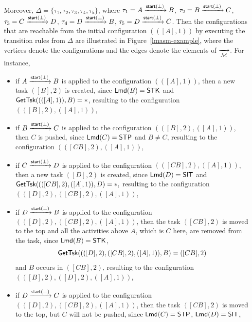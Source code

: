 \begin{example}
	Moreover, $\Delta = \{\tau_1, \tau_2, \tau_3, \tau_4, \tau_5\}$, where 
			$\tau_1 = A \xrightarrow{{\mathsf{start} }(\bot)} B$,
			$\tau_2 = B \xrightarrow{{\mathsf{start} }(\bot)} C$,
			$\tau_3 = C \xrightarrow{{\mathsf{start} }(\bot)} D$,
			$\tau_4 = D \xrightarrow{{\mathsf{start} }(\bot)} B$,
			$\tau_5 = D \xrightarrow{{\mathsf{start} }(\bot)} C$.
	Then the configurations that are reachable from the initial configuration $(([A], 1))$ by executing the transition rules from $\Delta$ are illustrated in Figure~\ref{lmasm-example}, where the vertices denote the configurations and the edges denote the elements of $\xrightarrow[{\mathcal{M} }]{}$. 
	For instance, 
	\begin{itemize}
	\item if $A \xrightarrow{{\mathsf{start} }(\bot)} B$ is applied to the configuration $(([A], 1))$, then a new task $([B],2)$ is created, since ${\sf Lmd}(B) = \mathsf{STK}$ and $\mathsf{GetTsk}((([A],1)), B) = *$, resulting to the configuration $(([B],2),([A],1))$,
	\item if $B \xrightarrow{{\mathsf{start} }(\bot)} C$ is applied to the configuration $(([B],2),([A],1))$, then $C$ is pushed, since ${\sf Lmd}(C) = \mathsf{STP}$ and $B\neq C$, resulting to the configuration $(([CB],2),([A],1))$,
	\item if $C \xrightarrow{{\mathsf{start} }(\bot)} D$ is applied to the configuration $(([CB],2),([A],1))$, then a new task $([D], 2)$ is created, since 
	${\sf Lmd}(D) = \mathsf{SIT}$ and $\mathsf{GetTsk}((([CB],2),([A],1)), D) = *,$ 
	resulting to the configuration $(([D],2),([CB],2),([A],1))$,
	\item if $D \xrightarrow{{\mathsf{start} }(\bot)} B$ is applied to the configuration $(([D],2),([CB],2),([A],1))$, then the task $([CB],2)$ is moved to the top and all the activities above $A$, which is $C$ here, are removed from the task, since ${\sf Lmd}(B) = \mathsf{STK}$, 
	$$\mathsf{GetTsk}((([D],2),([CB],2),([A],1)), B) = ([CB],2)$$
	and $B$ occurs in $([CB], 2)$, resulting to the configuration $(([B],2),([D],2),([A],1))$,
	\item if $D \xrightarrow{{\mathsf{start} }(\bot)} C$ is applied to the configuration $(([D],2),([CB],2),([A],1))$, then the task $([CB],2)$ is moved to the top, but $C$ will not be pushed, since ${\sf Lmd}(C) = \mathsf{STP}$, ${\sf Lmd}(D) = \mathsf{SIT}$,

\end{itemize}
\end{example}
